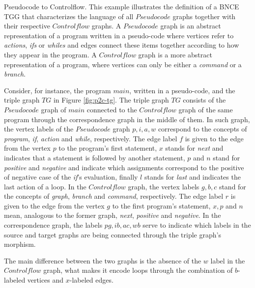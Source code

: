 \documentclass[]{report}
\begin{document}
\begin{example}{Pseudocode to Controlflow.}
	\label{ex:pseudocode2controlflow}
	This example illustrates the definition of a BNCE TGG that characterizes the language of all $Pseudocode$ graphs together with their respective $Controlflow$ graphs. A $Pseudocode$ graph is an abstract representation of a program written in a pseudo-code where vertices refer to \textit{actions}, \textit{ifs} or \textit{whiles} and edges connect these items together according to how they appear in the program. A $Controlflow$ graph is a more abstract representation of a program, where vertices can only be either a \textit{command} or a \textit{branch}.
	
	Consider, for instance, the program $main$, written in a pseudo-code, and the triple graph $TG$ in Figure \ref{fig:p2c-tg}. The triple graph $TG$ consists of the $Pseudocode$ graph of $main$ connected to the $Controlflow$ graph of the same program through the correspondence graph in the middle of them. In such graph, the vertex labels of the $Pseudocode$ graph $p, i, a, w$ correspond to the concepts of \textit{program}, \textit{if}, \textit{action} and \textit{while}, respectively. The edge label $f$ is given to the edge from the vertex $p$ to the program's first statement, $x$ stands for \textit{next} and indicates that a statement is followed by another statement, $p$ and $n$ stand for \textit{positive} and \textit{negative} and indicate which assignments correspond to the positive of negative case of the \textit{if}'s evaluation, finally $l$ stands for \textit{last} and indicates the last action of a loop. In the $Controlflow$ graph, the vertex labels $g, b, c$ stand for the concepts of \textit{graph}, \textit{branch} and \textit{command}, respectively. The edge label $r$ is given to the edge from the vertex $g$ to the first program's statement, $x, p$ and $n$ mean, analogous to the former graph, \textit{next}, \textit{positive} and \textit{negative}. In the correspondence graph, the labels $pg, ib, ac, wb$ serve to indicate which labels in the source and target graphs are being connected through the triple graph's morphism.
	
	
	
	The main difference between the two graphs is the absence of the $w$ label in the $Controlflow$ graph, what makes it encode loops through the combination of $b$-labeled vertices and $x$-labeled edges.
	

\end{example}
\end{document}
